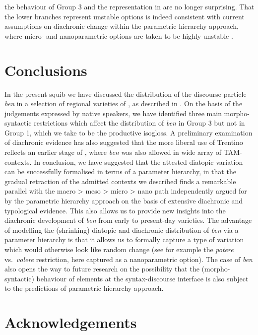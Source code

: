 \documentclass[output=paper]{langsci/langscibook}
\begin{document}
the behaviour of Group 3 and the representation in  are no longer
surprising. That the lower branches represent unstable options is indeed
consistent with current assumptions on diachronic change within the parametric
hierarchy approach, where micro- and nanoparametric options are taken to be
highly unstable \parencite[261]{BibRob2016}.

\section{Conclusions}\label{sec:23-conclusions}

In the present squib we have discussed the distribution of the discourse
particle \emph{ben} in a selection of regional varieties of , as
described in \textcite{CognSchi2015,CognSchi2018b,CognSchi2018}. On the basis
of the judgements expressed by native speakers, we have identified three main
morpho-syntactic restrictions which affect the distribution of \emph{ben} in
Group 3 but not in Group 1, which we take to be the productive isogloss. A
preliminary examination of diachronic evidence has also suggested that the more
liberal use of Trentino reflects an earlier stage of , where
\emph{ben} was also allowed in wide array of TAM-contexts. In conclusion, we
have suggested that the attested diatopic variation can be successfully
formalised in terms of a parameter hierarchy, in that the gradual retraction of
the admitted contexts we described finds a remarkable parallel with the macro >
meso > micro > nano path independently argued for by the parametric hierarchy
approach on the basis of extensive diachronic and typological evidence. This
also allows us to provide new insights into the diachronic development of
\emph{ben} from early  to present-day varieties. The advantage of
modelling the (shrinking) diatopic and diachronic distribution of \emph{ben}
via a parameter hierarchy is that it allows us to formally capture a type of
variation which would otherwise look like random change (see for example the
\emph{potere} vs.\ \emph{volere} restriction, here captured as a nanoparametric
option). The case of  \emph{ben} also opens the way to future research
on the possibility that the (morpho-syntactic) behaviour of elements at the
syntax-discourse interface is also subject to the predictions of parametric
hierarchy approach.

\printchapterglossary{}

\section*{Acknowledgements}
\end{document}
